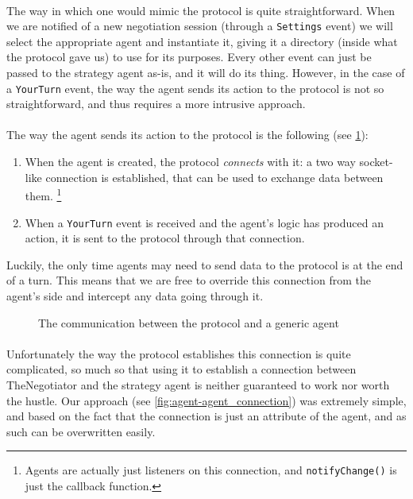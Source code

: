 \paragraph*{}
The way in which one would mimic the protocol is quite straightforward. When we are notified of a new negotiation session (through a \texttt{Settings} event) we will select the appropriate agent and instantiate it, giving it a directory (inside what the protocol gave us) to use for its purposes. Every other event can just be passed to the strategy agent as-is, and it will do its thing. However, in the case of a \texttt{YourTurn} event, the way the agent sends its action to the protocol is not so straightforward, and thus requires a more intrusive approach.

\paragraph*{}
The way the agent sends its action to the protocol is the following (see \cref{fig:protocol-agent_connection}):
\begin{enumerate}
    \item When the agent is created, the protocol \emph{connects} with it: a two way socket-like connection is established, that can be used to exchange data between them. \footnote{Agents are actually just listeners on this connection, and \texttt{notifyChange()} is just the callback function.}
    
    \item When a \texttt{YourTurn} event is received and the agent's logic has produced an action, it is sent to the protocol through that connection.
\end{enumerate}
Luckily, the only time agents may need to send data to the protocol is at the end of a turn. This means that we are free to override this connection from the agent's side and intercept any data going through it.

\begin{figure}[H]
\centering
{}
\captionsetup{justification=centering}
\caption{The communication between the protocol and a generic agent}
\label{fig:protocol-agent_connection}
\end{figure}


\paragraph*{}
Unfortunately the way the protocol establishes this connection is quite complicated, so much so that using it to establish a connection between TheNegotiator and the strategy agent is neither guaranteed to work nor worth the hustle. %
Our approach (see \cref{fig:agent-agent_connection}) was extremely simple, and based on the fact that the connection is just an attribute of the agent, and as such can be overwritten easily.


